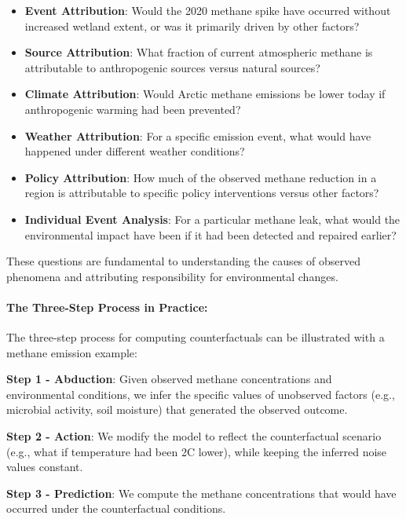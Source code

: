 \begin{itemize}
	\item \textbf{Event Attribution}: Would the 2020 methane spike have occurred without increased wetland extent, or was it primarily driven by other factors?

	\item \textbf{Source Attribution}: What fraction of current atmospheric methane is attributable to anthropogenic sources versus natural sources?

	\item \textbf{Climate Attribution}: Would Arctic methane emissions be lower today if anthropogenic warming had been prevented?

	\item \textbf{Weather Attribution}: For a specific emission event, what would have happened under different weather conditions?

	\item \textbf{Policy Attribution}: How much of the observed methane reduction in a region is attributable to specific policy interventions versus other factors?

	\item \textbf{Individual Event Analysis}: For a particular methane leak, what would the environmental impact have been if it had been detected and repaired earlier?
\end{itemize}

These questions are fundamental to understanding the causes of observed phenomena and attributing responsibility for environmental changes.

\paragraph{The Three-Step Process in Practice:}

The three-step process for computing counterfactuals can be illustrated with a methane emission example:

\textbf{Step 1 - Abduction}: Given observed methane concentrations and environmental conditions, we infer the specific values of unobserved factors (e.g., microbial activity, soil moisture) that generated the observed outcome.

\textbf{Step 2 - Action}: We modify the model to reflect the counterfactual scenario (e.g., what if temperature had been 2\textdegree C lower), while keeping the inferred noise values constant.

\textbf{Step 3 - Prediction}: We compute the methane concentrations that would have occurred under the counterfactual conditions.

